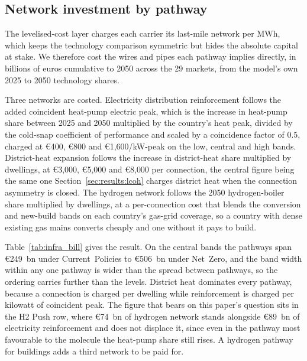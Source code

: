 \subsection{Network investment by pathway}
\label{sec:results:infrabill}

The levelised-cost layer charges each carrier its last-mile network per MWh, which keeps
the technology comparison symmetric but hides the absolute capital at stake. We therefore
cost the wires and pipes each pathway implies directly, in billions of euros cumulative to
2050 across the 29 markets, from the model's own 2025 to 2050 technology shares.

Three networks are costed. Electricity distribution reinforcement follows the added
coincident heat-pump electric peak, which is the increase in heat-pump share between 2025
and 2050 multiplied by the country's heat peak, divided by the cold-snap coefficient of
performance and scaled by a coincidence factor of $0.5$, charged at \euro{}400, \euro{}800
and \euro{}1{,}600/kW-peak on the low, central and high bands. District-heat expansion
follows the increase in district-heat share multiplied by dwellings, at \euro{}3{,}000,
\euro{}5{,}000 and \euro{}8{,}000 per connection, the central figure being the same one
Section~\ref{sec:results:lcoh} charges district heat when the connection asymmetry is
closed. The hydrogen network follows the 2050 hydrogen-boiler share multiplied by
dwellings, at a per-connection cost that blends the conversion and new-build bands on each
country's gas-grid coverage, so a country with dense existing gas mains converts cheaply
and one without it pays to build.



Table~\ref{tab:infra_bill} gives the result. On the central bands the pathways span
\euro{}249~bn under Current~Policies to \euro{}506~bn under Net~Zero, and the band width
within any one pathway is wider than the spread between pathways, so the ordering carries
further than the levels. District heat dominates every pathway, because a connection is
charged per dwelling while reinforcement is charged per kilowatt of coincident peak. The
figure that bears on this paper's question sits in the H2 Push row, where
\euro{}74~bn of hydrogen network stands alongside \euro{}89~bn of electricity
reinforcement and does not displace it, since even in the pathway most favourable to the
molecule the heat-pump share still rises. A hydrogen pathway for buildings adds a third network
to be paid for.

